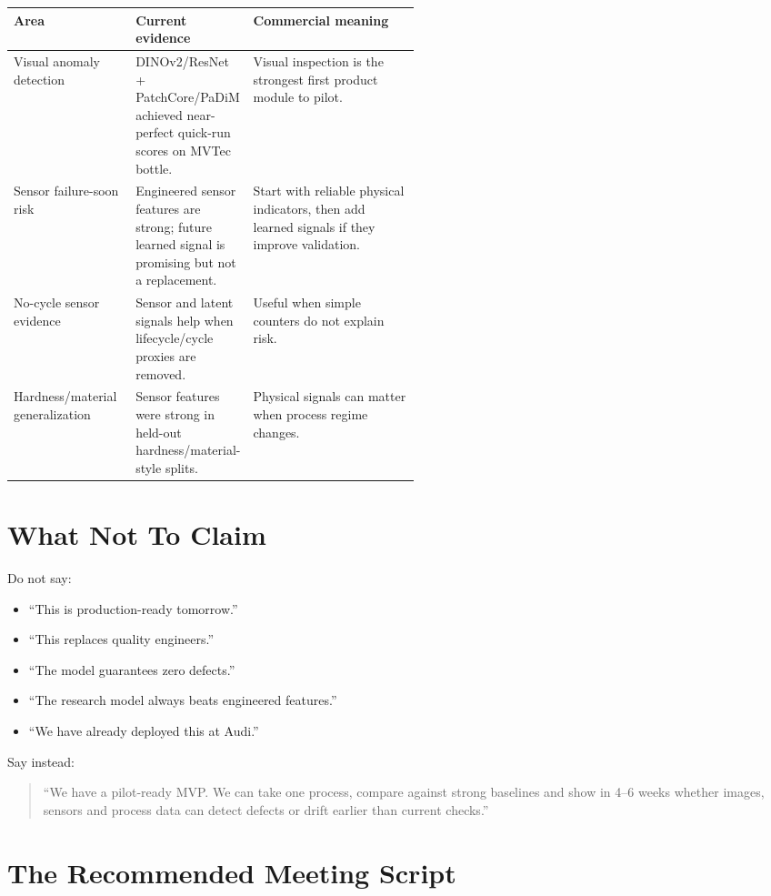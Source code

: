 \documentclass[11pt,a4paper]{article}
\begin{document}
\begin{tabularx}{\linewidth}{@{}p{0.30\linewidth}p{0.22\linewidth}Y@{}}
\toprule
\textbf{Area} & \textbf{Current evidence} & \textbf{Commercial meaning} \\
\midrule
Visual anomaly detection & DINOv2/ResNet + PatchCore/PaDiM achieved near-perfect quick-run scores on MVTec bottle. & Visual inspection is the strongest first product module to pilot. \\
Sensor failure-soon risk & Engineered sensor features are strong; future learned signal is promising but not a replacement. & Start with reliable physical indicators, then add learned signals if they improve validation. \\
No-cycle sensor evidence & Sensor and latent signals help when lifecycle/cycle proxies are removed. & Useful when simple counters do not explain risk. \\
Hardness/material generalization & Sensor features were strong in held-out hardness/material-style splits. & Physical signals can matter when process regime changes. \\
\bottomrule
\end{tabularx}

\section{What Not To Claim}
Do not say:
\begin{itemize}
  \item ``This is production-ready tomorrow.''
  \item ``This replaces quality engineers.''
  \item ``The model guarantees zero defects.''
  \item ``The research model always beats engineered features.''
  \item ``We have already deployed this at Audi.''
\end{itemize}

Say instead:
\begin{quote}
``We have a pilot-ready MVP. We can take one process, compare against strong baselines and show in 4--6 weeks whether images, sensors and process data can detect defects or drift earlier than current checks.''
\end{quote}

\section{The Recommended Meeting Script}
\end{document}
